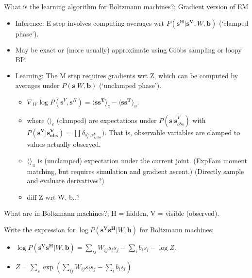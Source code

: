 \documentclass{article}
\begin{document}
What is the learning algorithm for Boltzmann machines?; Gradient version of EM \begin{itemize} \item Inference: E step involves computing averages wrt $P(\mathbf{s^H|s^V}, W, \mathbf{b})$ (`clamped phase'). \item May be exact or (more usually) approximate using Gibbs sampling or loopy BP. \item Learning: The M step requires gradients wrt Z, which can be computed by averages under $P(\mathbf{s}|W, \mathbf{b})$ (`unclamped phase'). \begin{itemize} \item $\nabla_W\log P(\mathbf{s}^V, \mathbf{s}^H)=\langle \mathbf{ss^T} \rangle_c - \langle \mathbf{ss^T} \rangle_u$. \item where $\langle \rangle_c$ (clamped) are expectations under $P(\mathbf{s|s}^V_{obs})$ with $P(\mathbf{s^V|s^V_{obs}})=\prod\delta_{s^V_i, s^V_{i, obs}})$. That is, observable variables are clamped to values actually observed. \item $\langle \rangle_u$ is (unclamped) expectation under the current joint. (ExpFam moment matching, but requires simulation and gradient ascent.) (Directly sample and evaluate derivatives?) \item diff Z wrt W, b..? \end{itemize} \end{itemize}

What are  in Boltzmann machines?; H = hidden, V = visible (observed).

Write the expression for $\log P(\mathbf{s^Vs^H}|W, \mathbf{b})$ for Boltzmann machines;  \begin{itemize} \item $\log P(\mathbf{s^Vs^H}|W, \mathbf{b})=\sum_{ij}W_{ij}s_is_j-\sum_ib_is_i - \log Z$. \item $Z=\sum_s \exp(\sum_{ij}W_{ij}s_is_j - \sum_i b_i s_i)$ \end{itemize}
\end{document}
